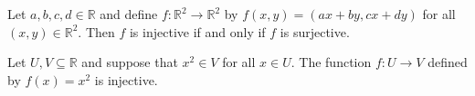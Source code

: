 \begin{chapex} %
\label{cqLinearMapInjectiveIffSurjective}
Let $a,b,c,d \in \mathbb{R}$ and define $f : \mathbb{R}^2 \to \mathbb{R}^2$ by $f(x,y) = (ax+by,cx+dy)$ for all $(x,y) \in \mathbb{R}^2$. Then $f$ is injective if and only if $f$ is surjective.
\end{chapex}

\begin{chapex} %
\label{cqFunctionsASNEnd}
Let $U, V \subseteq \mathbb{R}$ and suppose that $x^2 \in V$ for all $x \in U$. The function $f : U \to V$ defined by $f(x) = x^2$ is injective.
\end{chapex}